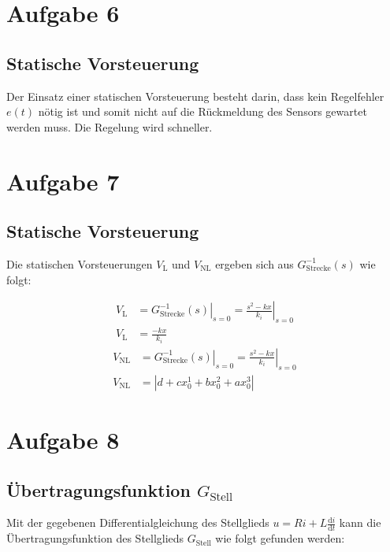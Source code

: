 \newpage 

\section{Aufgabe 6}\label{sec:Aufgabe6}
	\subsection*{Statische Vorsteuerung}\label{sub:statisch_ff}
	Der Einsatz einer statischen Vorsteuerung besteht darin, dass kein Regelfehler $e(t)$ nötig ist und somit nicht auf die Rückmeldung des Sensors gewartet werden muss. Die Regelung wird schneller.


\section{Aufgabe 7}\label{sec:Aufgabe6}
	\subsection*{Statische Vorsteuerung}\label{sub:statisch_ff}
	Die statischen Vorsteuerungen $V_{\mathrm{L}}$ und 	$V_{\mathrm{NL}}$ ergeben sich aus $G_{\mathrm{Strecke}}^{-1}(s)$ wie folgt:
	
	\begin{align}\label{eq:VL} 
		V_{\mathrm{L}} &= \left. G_{\mathrm{Strecke}}^{-1}(s) \right |_{s = 0} = \left. \frac{s^2-kx}{k_i} \right |_{s = 0}  \nonumber\\
		V_{\mathrm{L}} &= \frac{-kx}{k_i}
	\end{align} 
	\begin{align}\label{eq:VL} 
		V_{\mathrm{NL}} &= \left. G_{\mathrm{Strecke}}^{-1}(s) \right |_{s = 0} = \left. \frac{s^2-kx}{k_i} \right |_{s = 0}  \nonumber\\
		V_{\mathrm{NL}} &= |d + cx_0^1 + bx_0^2 + ax_0^3|
	\end{align} 

\section{Aufgabe 8}\label{sec:Aufgabe8}
	\subsection*{Übertragungsfunktion $G_{\mathrm{Stell}}$ }\label{sub:transfer_Gstell}
	Mit der gegebenen Differentialgleichung des Stellglieds $u = Ri +L\frac{\mathrm{d}i}{\mathrm{d}t}$ kann die Übertragungsfunktion des Stellglieds $G_{\mathrm{Stell}}$ wie folgt gefunden werden:

